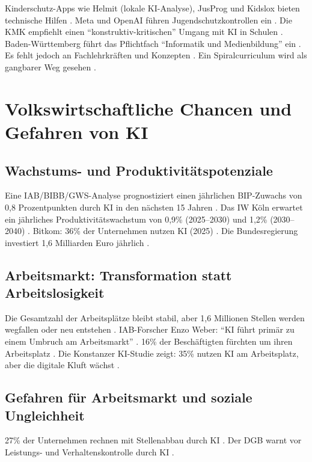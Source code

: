 \documentclass[12pt,a4paper]{article}
\begin{document}
	Kinderschutz-Apps wie Helmit (lokale KI-Analyse), JusProg und Kidslox bieten technische Hilfen \cite{Helmit2025, JusProg2025, Kidslox2025}. Meta und OpenAI führen Jugendschutzkontrollen ein \cite{Meta2025, OpenAI2025}. Die KMK empfiehlt einen \enquote{konstruktiv-kritischen} Umgang mit KI in Schulen \cite{KMK2025}. Baden-Württemberg führt das Pflichtfach \enquote{Informatik und Medienbildung} ein \cite{BW2025}. Es fehlt jedoch an Fachlehrkräften und Konzepten \cite{DLV2025}. Ein Spiralcurriculum wird als gangbarer Weg gesehen \cite{Spiralcurriculum2025}.
	
	\section{Volkswirtschaftliche Chancen und Gefahren von KI}
	
	\subsection{Wachstums- und Produktivitätspotenziale}
	
	Eine IAB/BIBB/GWS-Analyse prognostiziert einen jährlichen BIP-Zuwachs von 0,8 Prozentpunkten durch KI in den nächsten 15 Jahren \cite{IAB2025a}. Das IW Köln erwartet ein jährliches Produktivitätswachstum von 0,9\% (2025–2030) und 1,2\% (2030–2040) \cite{IW2025}. Bitkom: 36\% der Unternehmen nutzen KI (2025) \cite{Bitkom2025}. Die Bundesregierung investiert 1,6 Milliarden Euro jährlich \cite{Vention2025}.
	
	\subsection{Arbeitsmarkt: Transformation statt Arbeitslosigkeit}
	
	Die Gesamtzahl der Arbeitsplätze bleibt stabil, aber 1,6 Millionen Stellen werden wegfallen oder neu entstehen \cite{IAB2025a}. IAB-Forscher Enzo Weber: \enquote{KI führt primär zu einem Umbruch am Arbeitsmarkt} \cite{IAB2025a}. 16\% der Beschäftigten fürchten um ihren Arbeitsplatz \cite{XING2025}. Die Konstanzer KI-Studie zeigt: 35\% nutzen KI am Arbeitsplatz, aber die digitale Kluft wächst \cite{Konstanz2025}.
	
	\subsection{Gefahren für Arbeitsmarkt und soziale Ungleichheit}
	
	27\% der Unternehmen rechnen mit Stellenabbau durch KI \cite{ifo2025}. Der DGB warnt vor Leistungs- und Verhaltenskontrolle durch KI \cite{DGB2025}.
	
\end{document}
